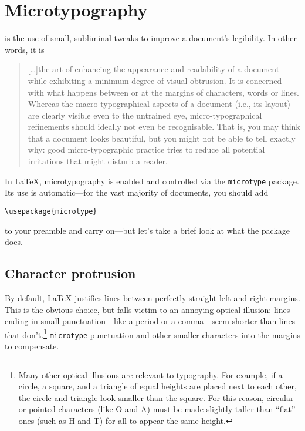 \chapter{Microtypography}
\label{microtype}

 is the use of small, subliminal tweaks to improve
a document's legibility.
In other words, it is
\begin{quote}
[\ldots]the art of enhancing the appearance and readability of a
document while exhibiting a minimum degree of visual obtrusion.
It is concerned with what happens between or at the margins of characters,
words or lines. Whereas the macro-typographical aspects of a document
(i.e., its layout) are clearly visible even to the untrained eye,
micro-typographical refinements should ideally not even be recognisable.
That is, you may think that a document looks beautiful, but you
might not be able to tell exactly why: good micro-typographic practice tries to
reduce all potential irritations that might disturb a reader.\punckern{}
\end{quote}

In \LaTeX{}, microtypography is enabled and controlled via the
\texttt{microtype} package.
Its use is automatic---for the vast majority of documents, you should add
\begin{leftfigure}
\begin{lstlisting}
\usepackage{microtype}
\end{lstlisting}
\end{leftfigure}
to your preamble and carry on---but let's take a brief look at what the package
does.

\section{Character protrusion}

By default, \LaTeX{} justifies lines between perfectly straight
left and right margins.
This is the obvious choice,
but falls victim to an annoying optical illusion:
lines ending in small punctuation---like a period or a
comma---seem shorter than lines that
don't.\punckern\footnote{Many other optical illusions are
relevant to typography. For example, if a circle, a square, and a triangle
of equal heights are placed next to each other,
the circle and triangle look smaller than the square.
For this reason, circular or pointed characters (like O and A) must
be made slightly taller than ``flat'' ones (such as H and T) for all
to appear the same height.\punckern{}}
\texttt{microtype}  punctuation and other smaller
characters into the margins to compensate.

